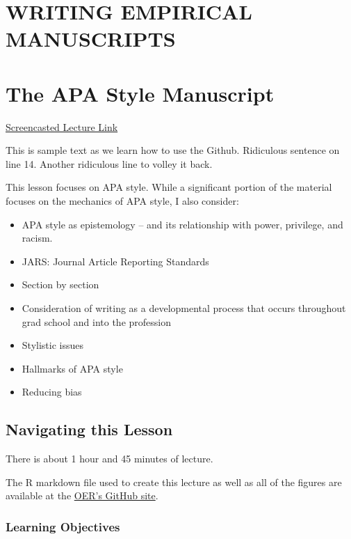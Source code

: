 \documentclass[
  11pt,
]{book}
\providecommand{\tightlist}{%
  \setlength{\itemsep}{0pt}\setlength{\parskip}{0pt}}
\begin{document}
\hypertarget{writing-empirical-manuscripts}{%
\chapter*{WRITING EMPIRICAL MANUSCRIPTS}\label{writing-empirical-manuscripts}}

\hypertarget{APAstyle}{%
\chapter{The APA Style Manuscript}\label{APAstyle}}

\href{https://spu.hosted.panopto.com/Panopto/Pages/Viewer.aspx?pid=8ca9d96d-0ff6-4068-a570-ac290189a4d4}{Screencasted Lecture Link}

This is sample text as we learn how to use the Github.
Ridiculous sentence on line 14. Another ridiculous line to volley it back.

This lesson focuses on APA style. While a significant portion of the material focuses on the mechanics of APA style, I also consider:

\begin{itemize}
\tightlist
\item
  APA style as epistemology -- and its relationship with power, privilege, and racism.
\item
  JARS: Journal Article Reporting Standards
\item
  Section by section
\item
  Consideration of writing as a developmental process that occurs throughout grad school and into the profession
\item
  Stylistic issues
\item
  Hallmarks of APA style
\item
  Reducing bias
\end{itemize}

\hypertarget{navigating-this-lesson}{%
\section{Navigating this Lesson}\label{navigating-this-lesson}}

There is about 1 hour and 45 minutes of lecture.

The R markdown file used to create this lecture as well as all of the figures are available at the \href{https://github.com/lhbikos/ReC_Topics}{OER's GitHub site}.

\hypertarget{learning-objectives}{%
\subsection{Learning Objectives}\label{learning-objectives}}
\end{document}
